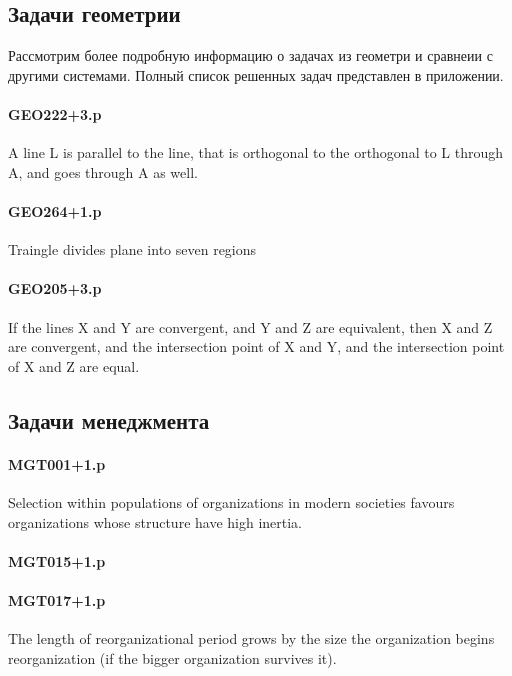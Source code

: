 \subsection{Задачи геометрии}
Рассмотрим более подробную информацию о задачах из геометри и сравнеии с другими системами. Полный список решенных задач представлен в приложении.

\paragraph{GEO222+3.p}
A line L is parallel to the line, that is orthogonal to the orthogonal to L through A, and goes through A as well.

\paragraph{GEO264+1.p}
Traingle divides plane into seven regions

\paragraph{GEO205+3.p}
If the lines X and Y are convergent, and Y and Z are  equivalent, then X and Z are convergent, and the intersection   point of X and Y, and the intersection point of X and Z are equal.

\subsection{Задачи менеджмента}

\paragraph{MGT001+1.p}
Selection within populations of organizations in modern societies favours organizations whose structure have high inertia.

\paragraph{MGT015+1.p}

\paragraph{MGT017+1.p}
 The length of reorganizational period grows by the size the organization begins reorganization (if the bigger organization survives it).

